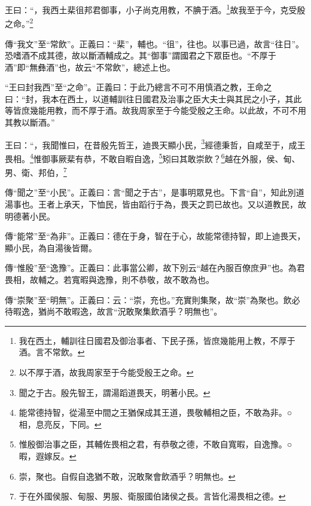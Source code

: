 王曰：“，我西土棐徂邦君御事，小子尚克用教，不腆于酒。\footnote{我在西土，輔訓往日國君及御治事者、下民子孫，皆庶幾能用上教，不厚于酒。言不常飲。}故我至于今，克受殷之命。”\footnote{以不厚于酒，故我周家至于今能受殷王之命。}


{\noindent\zhuan{}\fzbyks 傳“我文”至“常飲”。正義曰：“棐”，輔也。“徂”，往也。以事已過，故言“往日”。恐嗜酒不成其德，故以斷酒輔成之。其“御事”謂國君之下眾臣也。“不厚于酒”即“無彝酒”也，故云“不常飲”，總述上也。 \par}

{\noindent\shu{}\fzkt “王曰封我西”至“之命”。正義曰：于此乃總言不可不用慎酒之教，王命之曰：“封，我本在西土，以道輔訓往日國君及治事之臣大夫士與其民之小子，其此等皆庶幾能用教，而不厚于酒。故我周家至于今能受殷之王命。以此故，不可不用其教以斷酒。” \par}

王曰：“，我聞惟曰，在昔殷先哲王，迪畏天顯小民，\footnote{聞之于古。殷先智王，謂湯蹈道畏天，明著小民。}經德秉哲，自咸至于，成王畏相。\footnote{能常德持智，從湯至中間之王猶保成其王道，畏敬輔相之臣，不敢為非。○相，息亮反，下同。}惟御事厥棐有恭，不敢自暇自逸，\footnote{惟殷御治事之臣，其輔佐畏相之君，有恭敬之德，不敢自寬暇，自逸豫。○暇，遐嫁反。}矧曰其敢崇飲？\footnote{崇，聚也。自假自逸猶不敢，況敢聚會飲酒乎？明無也。}越在外服，侯、甸、男、衛、邦伯，\footnote{于在外國侯服、甸服、男服、衛服國伯諸侯之長。言皆化湯畏相之德。}

{\noindent\zhuan{}\fzbyks 傳“聞之”至“小民”。正義曰：言“聞之于古”，是事明眾見也。下言“自”，知此別道湯事也。王者上承天，下恤民，皆由蹈行于為，畏天之罰已故也。又以道教民，故明德著小民。 \par}

{\noindent\zhuan{}\fzbyks 傳“能常”至“為非”。正義曰：德在于身，智在于心，故能常德持智，即上迪畏天，顯小民，為自湯後皆爾。 \par}

{\noindent\zhuan{}\fzbyks 傳“惟殷”至“逸豫”。正義曰：此事當公卿，故下別云“越在內服百僚庶尹”也。為君畏相，故輔之。若寬暇與逸豫，則不恭敬，故不敢為也。 \par}

{\noindent\zhuan{}\fzbyks 傳“崇聚”至“明無”。正義曰：云：“崇，充也。”充實則集聚，故“崇”為聚也。飲必待暇逸，猶尚不敢暇逸，故言“況敢聚集飲酒乎？明無也”。 \par}

